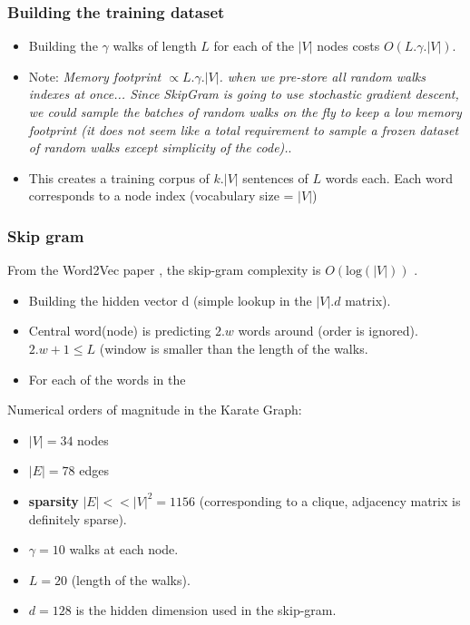 \documentclass[a4paper]{article}
\begin{document}
\subsubsection*{Building the training dataset}
\begin{itemize}
    \item Building the $\gamma$ walks of length $L$ for each of the $|V|$ nodes costs \textbf{$O(L.\gamma.|V|)$}.
    \item Note: \textit{Memory footprint  $\propto L.\gamma.|V|$. when we pre-store all random walks indexes at once...
    Since SkipGram is going to use stochastic gradient descent,
    we could sample the batches of random walks on the fly to keep a low memory footprint (it does not seem like a total requirement
    to sample a frozen dataset of random walks except simplicity of the code).}.
    \item This creates a training corpus of $k.|V|$ sentences of $L$ words each. Each word corresponds to a node index (vocabulary size = $|V|$) \cite{Perozzi_2014}
\end{itemize}


\subsubsection*{Skip gram}
From the Word2Vec paper \cite{mikolov2013efficient}, the skip-gram complexity is $O(\text{log}(|V|))$ .
\begin{itemize}
    \item Building the hidden vector {d} (simple lookup in the $|V|.d$ matrix).
    \item Central word(node) is predicting $2.w$ words around (order is ignored). $2.w+1\leq L$ (window is smaller than the length of the walks.
    \item For each of the words in the 
\end{itemize}

Numerical orders of magnitude in the Karate Graph:
\begin{itemize}
    \item $|V| = 34$ nodes
    \item $|E| = 78$ edges
    \item \textbf{sparsity}  $|E| << |V|^2 = 1156$ (corresponding to a clique, adjacency matrix is definitely sparse).
    \item $\gamma = 10$ walks at each node.
    \item $L=20$ (length of the walks).
    \item $d=128$ is the hidden dimension used in the skip-gram.
\end{itemize}
\end{document}
